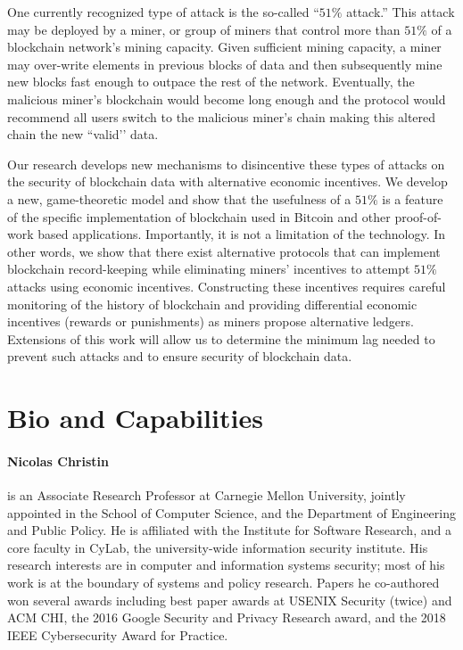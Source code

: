 \documentclass[runningheads, 12pt]{article}
\begin{document}
One currently recognized type of attack is the so-called “$51\%$ attack.” This attack may be deployed by a miner, or group of miners that control more than $51\%$ of a blockchain network’s mining capacity. Given sufficient mining capacity, a miner may over-write elements in previous blocks of data and then subsequently mine new blocks fast enough to outpace the rest of the network. Eventually, the malicious miner’s blockchain would become long enough and the protocol would recommend all users switch to the malicious miner’s chain making this altered chain the new ``valid’’ data.



Our research develops new mechanisms to disincentive these types of attacks on the security of blockchain data with alternative economic incentives. We develop a new, game-theoretic model and show that the usefulness of a $51\%$ is a feature of the specific implementation of blockchain used in Bitcoin and other proof-of-work based applications. Importantly, it is not a limitation of the technology. In other words, we show that there exist alternative protocols that can implement blockchain record-keeping while eliminating miners’ incentives to attempt $51\%$ attacks using economic incentives. Constructing these incentives requires careful monitoring of the history of blockchain and providing differential economic incentives (rewards or punishments) as miners propose alternative ledgers. Extensions of this work will allow us to determine the minimum lag needed to prevent such attacks and to ensure security of blockchain data.

\vspace{-5pt}
\section{Bio and Capabilities}
\vspace{-4pt}

\paragraph{Nicolas Christin} is an Associate Research Professor at Carnegie Mellon University, jointly appointed in the School of Computer Science, and the Department of Engineering and Public Policy. He is affiliated with the Institute for Software Research, and a core faculty in CyLab, the university-wide information security institute. His research interests are in computer and information systems security; most of his work is at the boundary of systems and policy research. Papers he co-authored won several awards including best paper awards at USENIX Security (twice) and ACM CHI, the 2016 Google Security and Privacy Research award, and the 2018 IEEE Cybersecurity Award for Practice.
\end{document}
